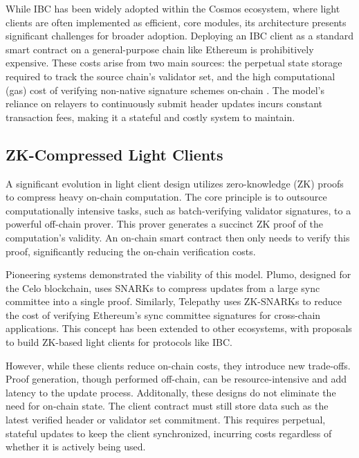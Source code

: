 \documentclass[runningheads]{llncs}
\begin{document}
While IBC has been widely adopted within the Cosmos ecosystem, where light clients are often implemented as efficient, core modules, its architecture presents significant challenges for broader adoption. Deploying an IBC client as a standard smart contract on a general-purpose chain like Ethereum is prohibitively expensive. These costs arise from two main sources: the perpetual state storage required to track the source chain's validator set, and the high computational (gas) cost of verifying non-native signature schemes on-chain \cite{Goel2022IBCZKSnarks}. The model's reliance on relayers to continuously submit header updates incurs constant transaction fees, making it a stateful and costly system to maintain.

\subsection{ZK-Compressed Light Clients}
A significant evolution in light client design utilizes zero-knowledge (ZK) proofs to compress heavy on-chain computation. The core principle is to outsource computationally intensive tasks, such as batch-verifying validator signatures, to a powerful off-chain prover. This prover generates a succinct ZK proof of the computation's validity. An on-chain smart contract then only needs to verify this proof, significantly reducing the on-chain verification costs.

Pioneering systems demonstrated the viability of this model. Plumo, designed for the Celo blockchain, uses SNARKs to compress updates from a large sync committee into a single proof\cite{Gabizon2021Plumo}. Similarly, Telepathy uses ZK-SNARKs to reduce the cost of verifying Ethereum's sync committee signatures for cross-chain applications\cite{Succinct2023Telepathy}. This concept has been extended to other ecosystems, with proposals to build ZK-based light clients for protocols like IBC\cite{Goel2022IBCZKSnarks,Succinct2025SP1}.

However, while these clients reduce on-chain costs, they introduce new trade-offs. Proof generation, though performed off-chain, can be resource-intensive and add latency to the update process. Additonally, these designs do not eliminate the need for on-chain state. The client contract must still store data such as the latest verified header or validator set commitment. This requires perpetual, stateful updates to keep the client synchronized, incurring costs regardless of whether it is actively being used.
\end{document}
